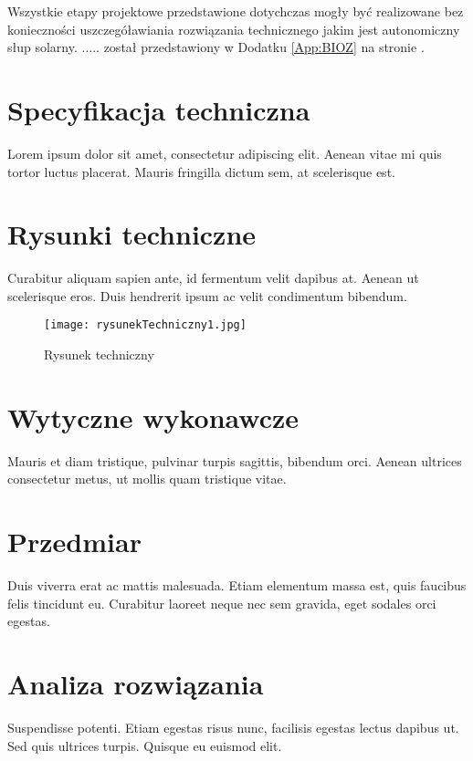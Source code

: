 \documentclass[skorowidz,xodstep,magisterska]{dyplomWIZUTMJ}
\begin{document}
Wszystkie etapy projektowe przedstawione dotychczas mogły być realizowane bez konieczności uszczegóławiania rozwiązania technicznego jakim jest autonomiczny słup solarny. .....  został przedstawiony w Dodatku \ref{App:BIOZ} na stronie \pageref{App:BIOZ}.


	\section{Specyfikacja techniczna \label{sec:ST}}
		Lorem ipsum dolor sit amet, consectetur adipiscing elit. Aenean vitae mi quis tortor luctus placerat. Mauris fringilla dictum sem, at scelerisque est.
	\section{Rysunki techniczne}
		 Curabitur aliquam sapien ante, id fermentum velit dapibus at. Aenean ut scelerisque eros. Duis hendrerit ipsum ac velit condimentum bibendum. 
		 \begin{figure}[H]
	\centering
	\texttt{[image: rysunekTechniczny1.jpg]}
	\caption[rysunek techniczny]{Rysunek techniczny}
	\label{fig:pic1}
\end{figure}

	\section{Wytyczne wykonawcze\label{sec:ProjWykonawczy}}
			Mauris et diam tristique, pulvinar turpis sagittis, bibendum orci. Aenean ultrices consectetur metus, ut mollis quam tristique vitae. 
	\section{Przedmiar\label{sec:Przedmiar}}
	Duis viverra erat ac mattis malesuada. Etiam elementum massa est, quis faucibus felis tincidunt eu. Curabitur laoreet neque nec sem gravida, eget sodales orci egestas.
	\section{Analiza rozwiązania \label{sec:Analiza}}
  Suspendisse potenti. Etiam egestas risus nunc, facilisis egestas lectus dapibus ut. Sed quis ultrices turpis. Quisque eu euismod elit.
		
\end{document}
